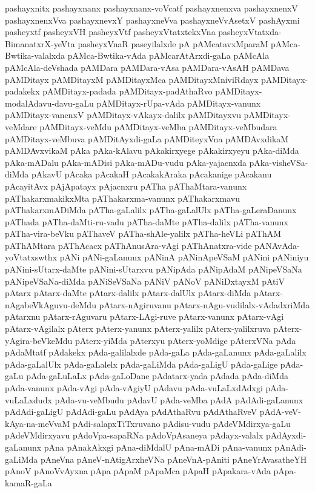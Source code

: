 {pashayxnitx
pashayxnanx
pashayxnanx-voVcatf
pashayxnenxva
pashayxnenxV
pashayxnenxVva
pashayxnevxY
pashayxneVva
pashayxneVvAsetxV
pashAyxmi
pasheyxtf
pasheyxVH
pasheyxVtf
pasheyxVtatxtekxVna
pasheyxVtatxda-BimanatxrX-yeVta
pasheyxVnaR
paseyilalxde
pA
pAMcatavxMparaM
pAMca-Bwtika-valalxda
pAMca-Bwtika-vAda
pAMcarAtArxdi-gaLa
pAMcAla
pAMcAla-deVshada
pAMDara
pAMDara-vAsa
pAMDara-vAsAH
pAMDava
pAMDitayx
pAMDitayxM
pAMDitayxMca
pAMDitayxMniviRdayx
pAMDitayx-padakekx
pAMDitayx-padada
pAMDitayx-padAthaRvo
pAMDitayx-modalAdavu-davu-gaLu
pAMDitayx-rUpa-vAda
pAMDitayx-vanunx
pAMDitayx-vanenxV
pAMDitayx-vAkayx-dalilx
pAMDitayxvu
pAMDitayx-veMdare
pAMDitayx-veMdu
pAMDitayx-veMba
pAMDitayx-veMbudara
pAMDitayx-veMbuva
pAMDitAyxdi-gaLa
pAMDiteyxVna
pAMDAvxdikaM
pAMDAvxvikaM
pAka
pAka-kAlavu
pAkakirxyege
pAkakirxyeyu
pAka-diMda
pAka-mADalu
pAka-mADisi
pAka-mADu-vudu
pAka-yajacnxda
pAka-visheVSa-diMda
pAkavU
pAcaka
pAcakaH
pAcakakAraka
pAcakanige
pAcakanu
pAcayitAvx
pAjApatayx
pAjacnxru
pATha
pAThaMtara-vanunx
pAThakarxmakikxMta
pAThakarxma-vanunx
pAThakarxmavu
pAThakarxmADiMda
pATha-gaLalilx
pATha-gaLalUlx
pATha-gaLeraDanunx
pAThada
pATha-daMti-ru-vadu
pATha-daMte
pATha-dalilx
pATha-vanunx
pATha-vira-beVku
pAThaveV
pATha-shAle-yalilx
pATha-heVLi
pAThAM
pAThAMtara
pAThAcacx
pAThAnusAra-vAgi
pAThAnatxra-vide
pANAvAda-yoVtatxswthx
pANi
pANi-gaLanunx
pANinA
pANinApeVSaM
pANini
pANiniyu
pANini-sUtarx-daMte
pANini-sUtarxvu
pANipAda
pANipAdaM
pANipeVSaNa
pANipeVSaNa-diMda
pANiSeVSaNa
pANiV
pANoV
pANiDxtayxM
pAtiV
pAtarx
pAtarx-daMte
pAtarx-dalilx
pAtarx-dalUlx
pAtarx-diMda
pAtarx-nAgabeVkAguvu-deMdu
pAtarx-nAgiruvanu
pAtarx-nAgu-vudilalx-vAdadxriMda
pAtarxnu
pAtarx-rAguvaru
pAtarx-LAgi-ruve
pAtarx-vanunx
pAtarx-vAgi
pAtarx-vAgilalx
pAterx
pAterx-yanunx
pAterx-yalilx
pAterx-yalilxruva
pAterx-yAgira-beVkeMdu
pAterx-yiMda
pAterxyu
pAterx-yoMdige
pAterxVNa
pAda
pAdaMtatf
pAdakekx
pAda-galilalxde
pAda-gaLa
pAda-gaLanunx
pAda-gaLalilx
pAda-gaLalUlx
pAda-gaLalelx
pAda-gaLiMda
pAda-gaLigU
pAda-gaLige
pAda-gaLu
pAda-gaLuLaLx
pAda-gaLoDane
pAdatarx-yada
pAdada
pAda-diMda
pAda-vanunx
pAda-vAgi
pAda-vAgiyU
pAdavu
pAda-vuLaLxdAdxgi
pAda-vuLaLxdudx
pAda-vu-veMbudu
pAdavU
pAda-veMba
pAdA
pAdAdi-gaLanunx
pAdAdi-gaLigU
pAdAdi-gaLu
pAdAya
pAdAthaRvu
pAdAthaRveV
pAdA-veV-kAya-na-meVvaM
pAdi-salapxTiTxruvano
pAdisu-vudu
pAdeVMdirxya-gaLu
pAdeVMdirxyavu
pAdoVpa-sapaRNa
pAdoVpAsaneya
pAdayx-valalx
pAdAyxdi-gaLanunx
pAna
pAnakAkxgi
pAna-diMdalU
pAna-mADi
pAna-vanunx
pAnAdi-gaLiMda
pAneVna
pAneV-nAtigArxheVNa
pAneVnA-pAniti
pAneYrAvasatheYH
pAnoV
pAnoVvAyxna
pApa
pApaM
pApaMca
pApaH
pApakara-vAda
pApa-kamaR-gaLa
}

